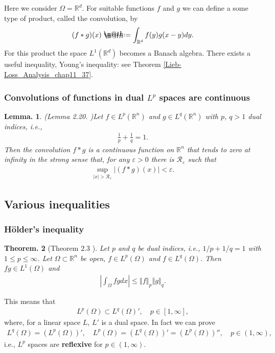 \documentclass[openany, a4paper, oneside]{book}
\makeatletter
\newcommand*{\defeq}{\mathrel{\rlap{%
\raisebox{0.3ex}{$\m@th\cdot$}}%
\raisebox{-0.3ex}{$\m@th\cdot$}}%
=}
\theoremstyle{break}
\newtheorem{thm}{Theorem.}[section]
\newtheorem{lem}[thm]{Lemma.}
\theoremstyle{breakdefn}
\newcommand{\abs}[1]{\left|#1\right|}
\newcommand{\norm}[1]{\left\Vert#1\right\Vert}
\newcommand{\rbk}[1]{\left (#1\right)}
\newcommand{\bbRd}{\mathbb{R}^d}
\newcommand{\bbRn}{\mathbb{R}^n}
\newcommand{\calR}{\mathcal{R}}
\makeatother
\begin{document}
Here we consider $\Omega = \bbRd$.
For suitable functions $f$ and $g$ we can define a some type of product, called the convolution, by
\begin{align}
 (f * g) (x)
 \defeq
 \int_{\bbRd} f (y) g (x - y) dy.
\end{align}
For this product the space $L^1 (\bbRd)$ becomes a Banach algebra.
There exists a useful inequality, Young's inequality: see Theorem \ref{Lieb-Loss_Analysis_chap11_37}.
\subsubsection{Convolutions of functions in dual $L^p$ spaces are continuous}
\label{sec-7-10-2-3-2}

      \begin{lem}\textup{(Lemma 2.20. \cite{LiebLoss1})}\label{Lieb-Loss_Analysis_chap11_41}
 Let $f \in L^p \rbk{\bbRn}$ and $g \in L^q (\bbRn)$ with $p$, $q > 1$ dual indices, i.e.,
 \begin{align}
  \frac{1}{p} + \frac{1}{q} = 1.
 \end{align}
 Then the convolution $f*g$ is a continuous function on $\bbRn$ that tends to zero at infinity in the strong sense that,
 for any $\varepsilon > 0$ there is $\calR_{\varepsilon}$ such that
 \begin{align}
  \sup_{\abs{x} > \calR_{\varepsilon}} \abs{(f*g) (x)} < \varepsilon.
 \end{align}
\end{lem}
\subsection{Various inequalities}
\label{sec-7-10-2-4}
\subsubsection{H\"older's inequality}
\label{sec-7-10-2-4-1}

\begin{thm}[Theorem 2.3 \cite{LiebLoss1}]
 Let $p$ and $q$ be dual indices, i.e., $1/p + 1/q = 1$ with $1 \leq p \leq \infty$.
 Let $\Omega \subset \bbRn$ be open, $f \in L^p (\Omega)$ and $f \in L^q \rbk{\Omega}$.
 Then $fg \in L^1 (\Omega)$ and
 \begin{align}
  \abs{\int_{\Omega} fg dx}
  \leq
  \norm{f}_p \norm{g}_q.
 \end{align}
\end{thm}
This means that
\begin{align}
 L^p \rbk{\Omega} \subset L^q \rbk{\Omega}', \quad p \in [1, \infty],
\end{align}
where, for a linear space $L$, $L'$ is a dual space.
In fact we can prove
\begin{align}
 L^q \rbk{\Omega} = \rbk{L^p \rbk{\Omega}}', \quad
 L^p \rbk{\Omega} = \rbk{L^q \rbk{\Omega}}' = \rbk{L^p \rbk{\Omega}}'', \quad
 p \in (1, \infty),
\end{align}
i.e., $L^p$ spaces are \textbf{reflexive} for $p \in (1, \infty)$.
\end{document}
